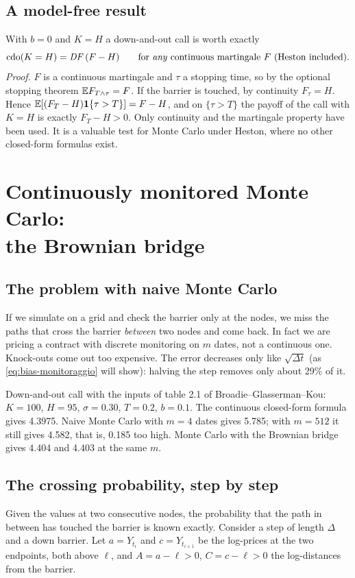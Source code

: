 \subsection{A model-free result}
With $b=0$ and $K=H$ a down-and-out call is worth exactly
\begin{equation}\label{eq:cdo-model-free}
\text{cdo}(K=H)=\mathit{DF}\,(F-H)\qquad\text{for \emph{any} continuous martingale }F\text{ (Heston included).}
\end{equation}
\emph{Proof.} $F$ is a continuous martingale and $\tau$ a stopping time, so by the optional stopping theorem
$\mathbb{E} F_{T\wedge\tau}=F$. If the barrier is touched, by continuity $F_\tau=H$. Hence
$\mathbb{E}[(F_T-H)\mathbf{1}\{\tau>T\}]=F-H$, and on $\{\tau>T\}$ the payoff of the call with $K=H$ is exactly $F_T-H>0$. Only
continuity and the martingale property have been used. It is a valuable test for Monte Carlo under Heston, where no
other closed-form formulas exist.

\section[Continuously monitored Monte Carlo: the Brownian bridge]{Continuously monitored Monte Carlo:\\
  the Brownian bridge}
\subsection{The problem with naive Monte Carlo}
If we simulate on a grid and check the barrier only at the nodes, we miss the paths that cross the barrier
\emph{between} two nodes and come back. In fact we are pricing a contract with discrete monitoring on $m$ dates, not a
continuous one. Knock-outs come out too expensive. The error decreases only like $\sqrt{\Delta t}$ (as
\eqref{eq:bias-monitoraggio} will show): halving the step removes only about 29\% of it.

\begin{esempio}
Down-and-out call with the inputs of table 2.1 of Broadie--Glasserman--Kou: $K=100$, $H=95$, $\sigma=0.30$, $T=0.2$,
$b=0.1$. The continuous closed-form formula gives 4.3975. Naive Monte Carlo with $m=4$ dates gives 5.785; with
$m=512$ it still gives 4.582, that is, 0.185 too high. Monte Carlo with the Brownian bridge gives 4.404 and 4.403 at
the same $m$.
\end{esempio}

\subsection{The crossing probability, step by step}
Given the values at two consecutive nodes, the probability that the path in between has touched the barrier is known
exactly. Consider a step of length $\Delta$ and a down barrier. Let $a=Y_{t_i}$ and $c=Y_{t_{i+1}}$ be the log-prices
at the two endpoints, both above $\ell$, and $A=a-\ell>0$, $C=c-\ell>0$ the log-distances from the barrier.


